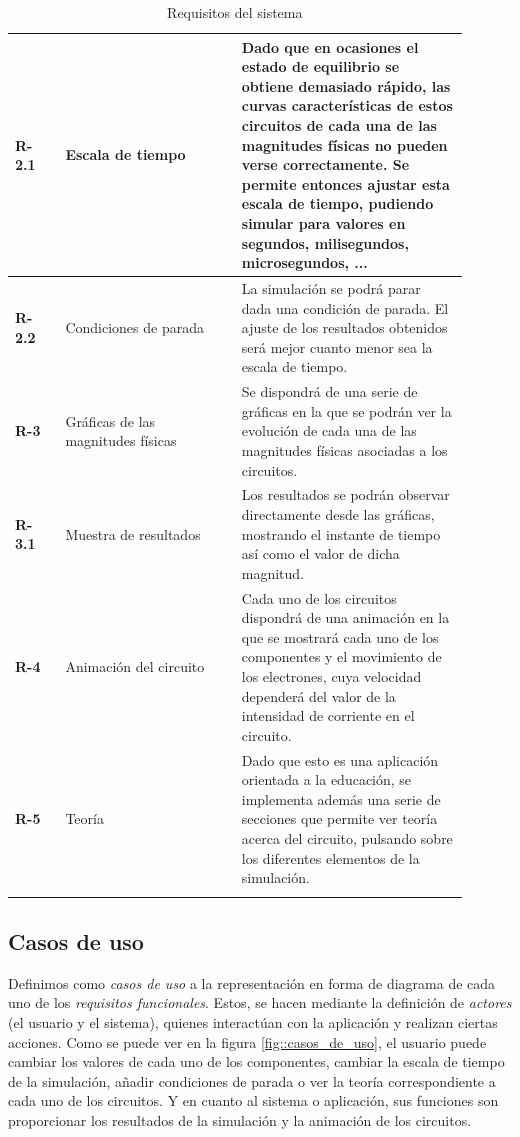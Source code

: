 \documentclass[../main.tex]{subfiles}
\begin{document}
\begin{longtable}{|| p{0.1\linewidth} | p{0.35\linewidth} |  p{0.45\linewidth} ||}
            \textbf{R-2.1} & Escala de tiempo & Dado que en ocasiones el estado de equilibrio se obtiene demasiado rápido, las curvas características de estos circuitos de cada una de las magnitudes físicas no pueden verse correctamente. Se permite entonces ajustar esta escala de tiempo, pudiendo simular para valores en segundos, milisegundos, microsegundos, ... \\ \hline
            
            \textbf{R-2.2} & Condiciones de parada & La simulación se podrá parar dada una condición de parada. El ajuste de los resultados obtenidos será mejor cuanto menor sea la escala de tiempo. \\ \hline
            
            \textbf{R-3} & Gráficas de las magnitudes físicas & Se dispondrá de una serie de gráficas en la que se podrán ver la evolución de cada una de las magnitudes físicas asociadas a los circuitos. \\ \hline
            
            \textbf{R-3.1} & Muestra de resultados & Los resultados se podrán observar directamente desde las gráficas, mostrando el instante de tiempo así como el valor de dicha magnitud. \\ \hline
            
            \textbf{R-4} & Animación del circuito & Cada uno de los circuitos dispondrá de una animación en la que se mostrará cada uno de los componentes y el movimiento de los electrones, cuya velocidad dependerá del valor de la intensidad de corriente en el circuito. \\ \hline
            
            \textbf{R-5} & Teoría & Dado que esto es una aplicación orientada a la educación, se implementa además una serie de secciones que permite ver teoría acerca del circuito, pulsando sobre los diferentes elementos de la simulación. \\ \hline
            
            
            
            
            \caption{Requisitos del sistema}
            \label{tab::requisitos}
            
        \end{longtable}


\subsection{Casos de uso}
Definimos como \textit{casos de uso} a la representación en forma de diagrama de cada uno de los \textit{requisitos funcionales}. Estos, se hacen mediante la definición de \textit{actores} (el usuario y el sistema), quienes interactúan con la aplicación y realizan ciertas acciones. Como se puede ver en la figura \ref{fig::casos_de_uso}, el usuario puede cambiar los valores de cada uno de los componentes, cambiar la escala de tiempo de la simulación, añadir condiciones de parada o ver la teoría correspondiente a cada uno de los circuitos. Y en cuanto al sistema o aplicación, sus funciones son proporcionar los resultados de la simulación y la animación de los circuitos.
\end{document}
